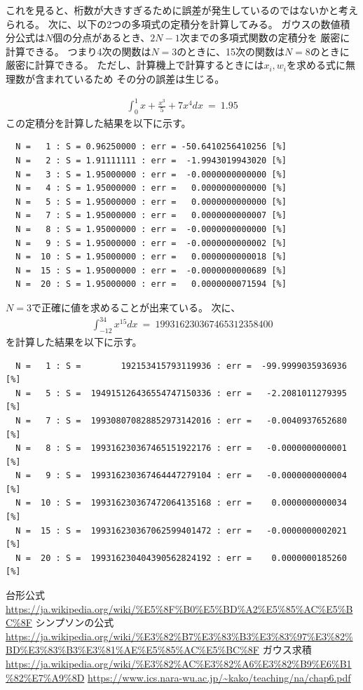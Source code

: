 \documentclass[dvipdfmx]{jsarticle}
\begin{document}
これを見ると、桁数が大きすぎるために誤差が発生しているのではないかと考えられる。
次に、以下の2つの多項式の定積分を計算してみる。
ガウスの数値積分公式は$N$個の分点があるとき、$2N-1$次までの多項式関数の定積分を
厳密に計算できる。
つまり4次の関数は$N=3$のときに、15次の関数は$N=8$のときに厳密に計算できる。
ただし、計算機上で計算するときには$x_i,w_i$を求める式に無理数が含まれているため
その分の誤差は生じる。

\begin{eqnarray}
  \int_{0}^{1} x+\frac{x^3}{5}+7x^4 dx ~=~ 1.95
\end{eqnarray}
この定積分を計算した結果を以下に示す。
\begin{verbatim}
  N =   1 : S = 0.96250000 : err = -50.6410256410256 [%]
  N =   2 : S = 1.91111111 : err =  -1.9943019943020 [%]
  N =   3 : S = 1.95000000 : err =  -0.0000000000000 [%]
  N =   4 : S = 1.95000000 : err =   0.0000000000000 [%]
  N =   5 : S = 1.95000000 : err =   0.0000000000000 [%]
  N =   7 : S = 1.95000000 : err =   0.0000000000007 [%]
  N =   8 : S = 1.95000000 : err =  -0.0000000000000 [%]
  N =   9 : S = 1.95000000 : err =  -0.0000000000002 [%]
  N =  10 : S = 1.95000000 : err =   0.0000000000018 [%]
  N =  15 : S = 1.95000000 : err =  -0.0000000000689 [%]
  N =  20 : S = 1.95000000 : err =   0.0000000071594 [%]
\end{verbatim}
$N=3$で正確に値を求めることが出来ている。
次に、
\begin{eqnarray}
  \int_{-12}^{34} x^{15} dx ~=~ 199316230367465312358400
\end{eqnarray}
を計算した結果を以下に示す。
\begin{verbatim}
  N =   1 : S =        192153415793119936 : err =  -99.9999035936936 [%]
  N =   5 : S =  194915126436554747150336 : err =   -2.2081011279395 [%]
  N =   7 : S =  199308070828852973142016 : err =   -0.0040937652680 [%]
  N =   8 : S =  199316230367465151922176 : err =   -0.0000000000001 [%]
  N =   9 : S =  199316230367464447279104 : err =   -0.0000000000004 [%]
  N =  10 : S =  199316230367472064135168 : err =    0.0000000000034 [%]
  N =  15 : S =  199316230367062599401472 : err =   -0.0000000002021 [%]
  N =  20 : S =  199316230404390562824192 : err =    0.0000000185260 [%]
\end{verbatim}



\begin{thebibliography}{10}
   台形公式
  \url{https://ja.wikipedia.org/wiki/%E5%8F%B0%E5%BD%A2%E5%85%AC%E5%BC%8F}
   シンプソンの公式
  \url{https://ja.wikipedia.org/wiki/%E3%82%B7%E3%83%B3%E3%83%97%E3%82%BD%E3%83%B3%E3%81%AE%E5%85%AC%E5%BC%8F}
   ガウス求積
  \url{https://ja.wikipedia.org/wiki/%E3%82%AC%E3%82%A6%E3%82%B9%E6%B1%82%E7%A9%8D}
  \url{https://www.ics.nara-wu.ac.jp/~kako/teaching/na/chap6.pdf}

\end{thebibliography}
\end{document}

